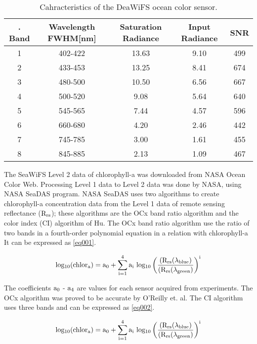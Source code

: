  \begin{table}[h]\textwidth
	\caption{Cahracteristics of the DeaWiFS ocean color sensor.}
	\label{table02}
	\centering
	\begin{tabular}{c|c|c|c|c}
		\hline \setlength{\arrayrulewidth}{0.8pt}. 
		Band	& Wavelength FWHM[nm] & Saturation Radiance & Input Radiance & SNR\\ \hline
		1 & 402-422 & 13.63 & 9.10 & 499 \\ \hline
		2 & 433-453 & 13.25 & 8.41 & 674  \\ \hline
		3 & 480-500 & 10.50 & 6.56 & 667 \\ \hline
		4 & 500-520 & 9.08 & 5.64 & 640  \\ \hline
		5 & 545-565 & 7.44 & 4.57 & 596 \\ \hline
		6 & 660-680 & 4.20 & 2.46 & 442  \\ \hline
		7 & 745-785 & 3.00 & 1.61 & 455 \\ \hline
		8 & 845-885 & 2.13 & 1.09 & 467  \\ \hline

	\end{tabular}
\end{table}
 
 The SeaWiFS Level 2 data of chlorophyll-a was downloaded from NASA Ocean Color Web. Processing Level 1 data to Level 2 data was done by NASA, using NASA SeaDAS program. NASA SeaDAS uses two algorithms to create chlorophyll-a concentration data from the Level 1 data of remote sensing reflectance ($\rm R_{rs}$); these algorithms are the OCx band ratio algorithm and the color index (CI) algorithm of Hu. 
 The OCx band ratio algorithm use the ratio of two bands in a fourth-order polynomial equation in a relation with chlorophyll-a It can be expressed as \eqref{eq001}.
 
 \begin{equation}
 {\rm log_{10} (chlor_a) = a_0 + \sum_{i=1}^4 a_i ~ log_{10} \left( \frac{(R_{rs}(\lambda_{blue})}{(R_{rs}(\lambda_{green})} \right) ^i }
 \label{eq001}
 \end{equation}
 
The coefficients $\rm a_0$ - $\rm a_4$ are values for each sensor acquired from experiments. The OCx algorithm was proved to be accurate by O’Reilly et. al\cite{o2000ocean}. The CI algorithm uses three bands and can be expressed as \eqref{eq002}.

 \begin{equation}
{\rm log_{10} (chlor_a) = a_0 + \sum_{i=1}^4 a_i ~ log_{10} \left( \frac{(R_{rs}(\lambda_{blue})}{(R_{rs}(\lambda_{green})} \right) ^i }
\label{eq002}
\end{equation}

